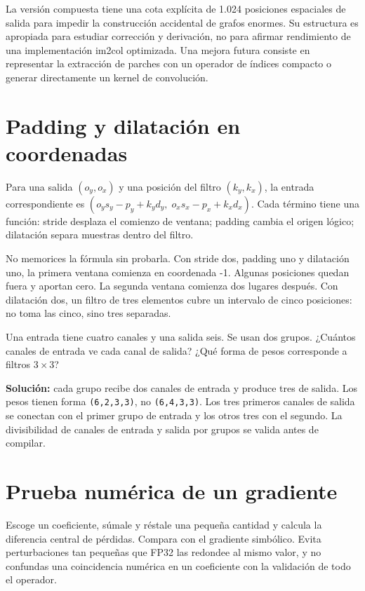 \documentclass[12pt,a4paper,oneside]{report}
\begin{document}
La versión compuesta tiene una cota explícita de 1.024 posiciones espaciales de salida para impedir la construcción accidental de grafos enormes. Su estructura es apropiada para estudiar corrección y derivación, no para afirmar rendimiento de una implementación im2col optimizada. Una mejora futura consiste en representar la extracción de parches con un operador de índices compacto o generar directamente un kernel de convolución.

\section{Padding y dilatación en coordenadas}
Para una salida $(o_y,o_x)$ y una posición del filtro $(k_y,k_x)$, la entrada correspondiente es $(o_y s_y-p_y+k_y d_y,\;o_x s_x-p_x+k_x d_x)$. Cada término tiene una función: stride desplaza el comienzo de ventana; padding cambia el origen lógico; dilatación separa muestras dentro del filtro.

No memorices la fórmula sin probarla. Con stride dos, padding uno y dilatación uno, la primera ventana comienza en coordenada -1. Algunas posiciones quedan fuera y aportan cero. La segunda ventana comienza dos lugares después. Con dilatación dos, un filtro de tres elementos cubre un intervalo de cinco posiciones: no toma las cinco, sino tres separadas.

\begin{practica}
Una entrada tiene cuatro canales y una salida seis. Se usan dos grupos. ¿Cuántos canales de entrada ve cada canal de salida? ¿Qué forma de pesos corresponde a filtros $3\times3$?

\textbf{Solución:} cada grupo recibe dos canales de entrada y produce tres de salida. Los pesos tienen forma \texttt{(6,2,3,3)}, no \texttt{(6,4,3,3)}. Los tres primeros canales de salida se conectan con el primer grupo de entrada y los otros tres con el segundo. La divisibilidad de canales de entrada y salida por grupos se valida antes de compilar.

\end{practica}
\section{Prueba numérica de un gradiente}
Escoge un coeficiente, súmale y réstale una pequeña cantidad y calcula la diferencia central de pérdidas. Compara con el gradiente simbólico. Evita perturbaciones tan pequeñas que FP32 las redondee al mismo valor, y no confundas una coincidencia numérica en un coeficiente con la validación de todo el operador.
\end{document}
